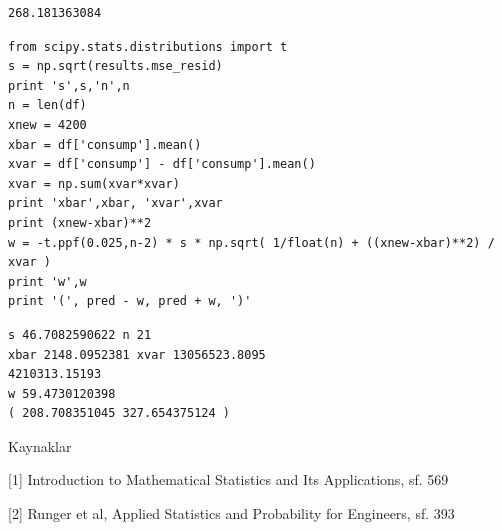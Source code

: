 \documentclass[12pt,fleqn]{article}\usepackage{../common}
\begin{document}
\begin{verbatim}
268.181363084
\end{verbatim}

\begin{verbatim}
from scipy.stats.distributions import t
s = np.sqrt(results.mse_resid)
print 's',s,'n',n
n = len(df)
xnew = 4200
xbar = df['consump'].mean()
xvar = df['consump'] - df['consump'].mean()
xvar = np.sum(xvar*xvar)
print 'xbar',xbar, 'xvar',xvar
print (xnew-xbar)**2
w = -t.ppf(0.025,n-2) * s * np.sqrt( 1/float(n) + ((xnew-xbar)**2) / xvar )
print 'w',w
print '(', pred - w, pred + w, ')'
\end{verbatim}

\begin{verbatim}
s 46.7082590622 n 21
xbar 2148.0952381 xvar 13056523.8095
4210313.15193
w 59.4730120398
( 208.708351045 327.654375124 )
\end{verbatim}


Kaynaklar

[1] Introduction to Mathematical Statistics and Its Applications, sf. 569

[2] Runger et al, Applied Statistics and Probability for Engineers, sf. 393
\end{document}
